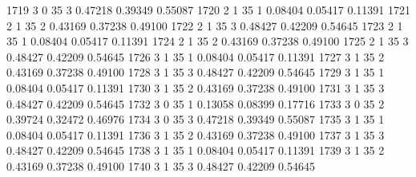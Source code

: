 \documentclass{article}
\begin{document}
\begin{Woutput}
1719      3       0      35       3       0.47218    0.39349    0.55087
1720      2       1      35       1       0.08404    0.05417    0.11391
1721      2       1      35       2       0.43169    0.37238    0.49100
1722      2       1      35       3       0.48427    0.42209    0.54645
1723      2       1      35       1       0.08404    0.05417    0.11391
1724      2       1      35       2       0.43169    0.37238    0.49100
1725      2       1      35       3       0.48427    0.42209    0.54645
1726      3       1      35       1       0.08404    0.05417    0.11391
1727      3       1      35       2       0.43169    0.37238    0.49100
1728      3       1      35       3       0.48427    0.42209    0.54645
1729      3       1      35       1       0.08404    0.05417    0.11391
1730      3       1      35       2       0.43169    0.37238    0.49100
1731      3       1      35       3       0.48427    0.42209    0.54645
1732      3       0      35       1       0.13058    0.08399    0.17716
1733      3       0      35       2       0.39724    0.32472    0.46976
1734      3       0      35       3       0.47218    0.39349    0.55087
1735      3       1      35       1       0.08404    0.05417    0.11391
1736      3       1      35       2       0.43169    0.37238    0.49100
1737      3       1      35       3       0.48427    0.42209    0.54645
1738      3       1      35       1       0.08404    0.05417    0.11391
1739      3       1      35       2       0.43169    0.37238    0.49100
1740      3       1      35       3       0.48427    0.42209    0.54645


\end{Woutput}
\end{document}
